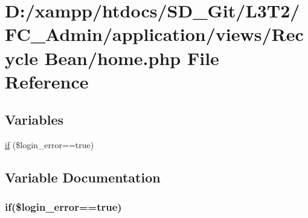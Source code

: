 \hypertarget{_admin_2application_2views_2_recycle_01_bean_2_home_8php}{}\section{D\+:/xampp/htdocs/\+S\+D\+\_\+\+Git/\+L3\+T2/\+F\+C\+\_\+\+Admin/application/views/\+Recycle Bean/home.php File Reference}
\label{_admin_2application_2views_2_recycle_01_bean_2_home_8php}
\subsection*{Variables}
\begin{DoxyCompactItemize}
\item 
\hyperlink{_admin_2application_2views_2_recycle_01_bean_2_home_8php_a2df9f8a5d54687f3bc3ac4ba1b3a89df}{if} (\$login\+\_\+error==true)
\end{DoxyCompactItemize}


\subsection{Variable Documentation}
\hypertarget{_admin_2application_2views_2_recycle_01_bean_2_home_8php_a2df9f8a5d54687f3bc3ac4ba1b3a89df}{}
\subsubsection[{if}]{\setlength{\rightskip}{0pt plus 5cm}if(\$login\+\_\+error==true)}\label{_admin_2application_2views_2_recycle_01_bean_2_home_8php_a2df9f8a5d54687f3bc3ac4ba1b3a89df}
